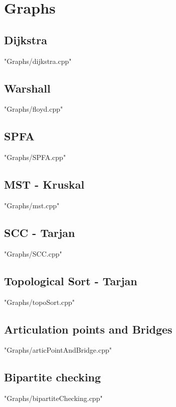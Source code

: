 \documentclass [12pt,twocolumn,oneside]{article}
\begin{document}
\pagestyle{fancy}
\fancyfoot{}
\fancyhead[R]{\thepage}
\renewcommand{\headrulewidth}{0.4pt}
\tableofcontents
\scriptsize

\bigskip

\newpage
\section{Graphs}
\subsection{ Dijkstra}
 {"Graphs/dijkstra.cpp"}

\subsection{ Warshall}
 {"Graphs/floyd.cpp"}

\subsection{ SPFA}
 {"Graphs/SPFA.cpp"}

\subsection{ MST - Kruskal}
 {"Graphs/mst.cpp"}

\subsection{ SCC - Tarjan}
 {"Graphs/SCC.cpp"}

\subsection{ Topological Sort - Tarjan}
 {"Graphs/topoSort.cpp"}

\subsection{ Articulation points and Bridges}
 {"Graphs/articPointAndBridge.cpp"}

\subsection{ Bipartite checking}
 {"Graphs/bipartiteChecking.cpp"}
\end{document}
